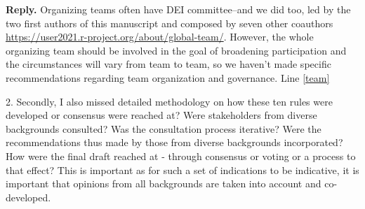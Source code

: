 \documentclass{article}
\newenvironment{Reply}{\noindent\color{BlueViolet}\textbf{Reply.}}{\vspace{1em}}
\begin{document}
\begin{Reply}
Organizing teams often have DEI committee--and we did too, led by the two first authors of this manuscript and composed by seven other coauthors \url{https://user2021.r-project.org/about/global-team/}. However, the whole organizing team should be involved in the goal of broadening participation and the circumstances will vary from team to team, so we haven't made specific recommendations regarding team organization and governance.
Line \ref{team}



\end{Reply}

2. Secondly, I also missed detailed methodology on how these ten rules were developed or consensus were reached at? Were stakeholders from diverse backgrounds consulted? Was the consultation process iterative? Were the recommendations thus made by those from diverse backgrounds incorporated? How were the final draft reached at - through consensus or voting or a process to that effect? This is important as for such a set of indications to be indicative, it is important that opinions from all backgrounds are taken into account and co-developed.
\end{document}
